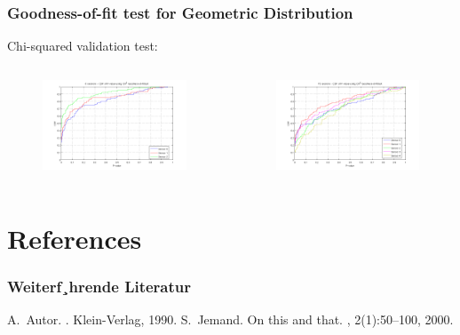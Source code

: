 \documentclass[9pt,handout,serif]{beamer}
\begin{document}
\begin{frame}
	\frametitle{Goodness-of-fit test for Geometric Distribution}
	Chi-squared validation test:
	
	\begin{columns}
		\begin{figure}
			\centering
			\includegraphics[width=1\textwidth]{../images/results/autocorrelation/localview/chi2/8sessions_cdf_p}
		\end{figure}
		\begin{figure}
			\centering
			\includegraphics[width=1\textwidth]{../images/results/autocorrelation/localview/chi2/15sessions_cdf_p}
		\end{figure}
	\end{columns}
\end{frame}

\section{References}

\begin{frame}[allowframebreaks]
  \frametitle<presentation>{Weiterf¸hrende Literatur}    
  \begin{thebibliography}{10}    
  \beamertemplatebookbibitems
    A.~Autor.
    .
    \newblock Klein-Verlag, 1990.
  \beamertemplatearticlebibitems
    S.~Jemand.
    \newblock On this and that.
    , 2(1):50--100, 2000.
  \end{thebibliography}
\end{frame}
\end{document}
